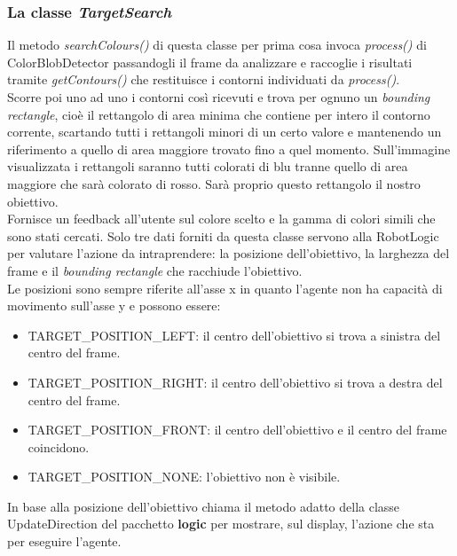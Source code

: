 \subsubsection{La classe \emph{TargetSearch}}
Il metodo \emph{searchColours()} di questa classe per prima cosa invoca \emph{process()} di ColorBlobDetector passandogli
il frame da analizzare e raccoglie i risultati tramite \emph{getContours()} che restituisce 
i contorni individuati da \emph{process()}.\\
Scorre poi uno ad uno i contorni così ricevuti e trova per ognuno un \emph{bounding rectangle}, 
cioè il rettangolo di area minima che contiene per intero il contorno corrente, 
scartando tutti i rettangoli minori di un certo valore e mantenendo un riferimento 
a quello di area maggiore trovato fino a quel momento. Sull'immagine visualizzata i rettangoli saranno tutti colorati di blu
tranne quello di area maggiore che sarà colorato di rosso. Sarà proprio questo 
rettangolo il nostro obiettivo.\\
Fornisce un feedback all'utente sul colore scelto e la gamma di colori simili 
che sono stati cercati. 
Solo tre dati forniti da questa classe servono alla RobotLogic per valutare l'azione 
da intraprendere:
la posizione dell'obiettivo, la larghezza del frame e il \emph{bounding rectangle} 
che racchiude l'obiettivo.\\
Le posizioni sono sempre riferite all'asse x in quanto l'agente non 
ha capacità di movimento sull'asse y e possono essere:
\begin{itemize}
	\item TARGET\_POSITION\_LEFT: il centro dell'obiettivo si trova a sinistra del centro del frame. 
	\item TARGET\_POSITION\_RIGHT: il centro dell'obiettivo si trova a destra del centro del frame. 
	\item TARGET\_POSITION\_FRONT: il centro dell'obiettivo e il centro del frame coincidono. 
	\item TARGET\_POSITION\_NONE: l'obiettivo non è visibile.
\end{itemize}
In base alla posizione dell'obiettivo chiama il metodo adatto della classe UpdateDirection del pacchetto \textbf{logic}
per mostrare, sul display, l'azione che sta per eseguire l'agente.

